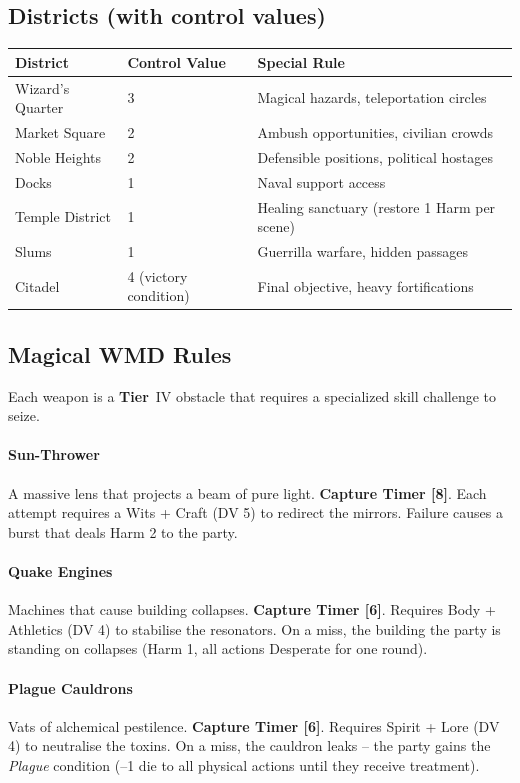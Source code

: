 \documentclass[11pt]{article}
\newcommand{\Term}[1]{\textbf{#1}}
\newcommand{\Tier}{\Term{Tier}}
\begin{document}
\subsection*{Districts (with control values)}

\begin{tabular}{@{}lll@{}}
\toprule
\textbf{District} & \textbf{Control Value} & \textbf{Special Rule}\\
\midrule
Wizard's Quarter & 3 & Magical hazards, teleportation circles\\
Market Square & 2 & Ambush opportunities, civilian crowds\\
Noble Heights & 2 & Defensible positions, political hostages\\
Docks & 1 & Naval support access\\
Temple District & 1 & Healing sanctuary (restore 1 Harm per scene)\\
Slums & 1 & Guerrilla warfare, hidden passages\\
Citadel & 4 (victory condition) & Final objective, heavy fortifications\\
\bottomrule
\end{tabular}

\subsection*{Magical WMD Rules}
Each weapon is a \Tier\ IV obstacle that requires a specialized skill challenge to seize.

\paragraph{Sun-Thrower}
A massive lens that projects a beam of pure light. \textbf{Capture Timer [8]}. Each attempt requires a Wits + Craft (DV 5) to redirect the mirrors. Failure causes a burst that deals Harm 2 to the party.

\paragraph{Quake Engines}
Machines that cause building collapses. \textbf{Capture Timer [6]}. Requires Body + Athletics (DV 4) to stabilise the resonators. On a miss, the building the party is standing on collapses (Harm 1, all actions Desperate for one round).

\paragraph{Plague Cauldrons}
Vats of alchemical pestilence. \textbf{Capture Timer [6]}. Requires Spirit + Lore (DV 4) to neutralise the toxins. On a miss, the cauldron leaks -- the party gains the \emph{Plague} condition (--1 die to all physical actions until they receive treatment).
\end{document}
